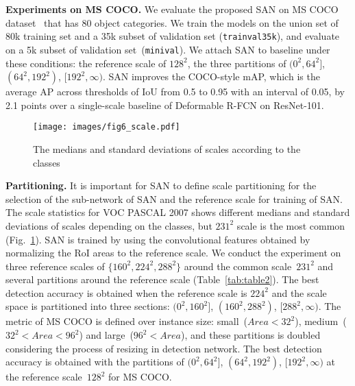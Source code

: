 \documentclass[runningheads]{llncs}
\begin{document}
\noindent
\textbf{Experiments on MS COCO.}
We evaluate the proposed SAN on MS COCO dataset~\cite{lin2014microsoft} that has 80 object categories.
We train the models on the union set of 80k training set and a 35k subset of validation set (\texttt{trainval35k}),
and evaluate on a 5k subset of validation set~(\texttt{minival}).
We attach SAN to baseline under these conditions:
the reference scale of $128^2$,
the three partitions of $(0^2,64^2]$, $(64^2,192^2)$, $[192^2,\infty)$.
SAN improves the COCO-style mAP, which is the average AP across thresholds of IoU from 0.5 to 0.95 with an interval of 0.05, by 2.1 points over a single-scale baseline of Deformable R-FCN on ResNet-101.
\\


\begin{figure}[t]
	\texttt{[image: images/fig6\_scale.pdf]}
	\caption{The medians and standard deviations of scales according to the classes}
	\centering
	\label{fig:SAN_scale}
\end{figure}




\noindent
\textbf{Partitioning.}
It is important for SAN to define scale partitioning for the selection of the sub-network of SAN and the reference scale for training of SAN.
The scale statistics for VOC PASCAL 2007 shows different medians and standard deviations of scales depending on the classes, but $231^2$ scale is the most common (Fig.~\ref{fig:SAN_scale}).
SAN is trained by using the convolutional features obtained by normalizing the RoI areas to the reference scale.
We conduct the experiment on three reference scales of $\{160^2, 224^2, 288^2\}$ around the common scale~$231^2$ and several partitions around the reference scale (Table~\ref{tab:table2}).
The best detection accuracy is obtained when the reference scale is $224^2$ and the scale space is partitioned into three sections: $(0^2,160^2]$, $(160^2,288^2)$, $[288^2,\infty)$.
The metric of MS COCO is defined over instance size:
small~($Area<32^2$), medium~($32^2<Area<96^2$) and large~($96^2<Area$),
and
these partitions is doubled considering the process of resizing in detection network.
The best detection accuracy is obtained with
the partitions of $(0^2,64^2]$, $(64^2,192^2)$, $[192^2,\infty)$ at the reference scale~$128^2$
for MS COCO.
\\
\end{document}
